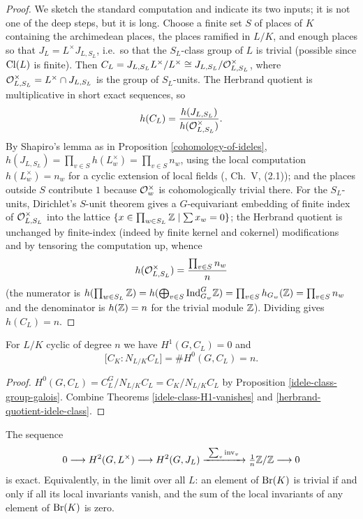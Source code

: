\begin{proof}
We sketch the standard computation and indicate its two inputs; it is not one of
the deep steps, but it is long.
Choose a finite set $S$ of places of $K$ containing the archimedean places, the
places ramified in $L/K$, and enough places so that $J_L=L^\times J_{L,S_L}$,
i.e.~so that the $S_L$-class group of $L$ is trivial (possible since ${\mathrm{Cl}}(L)$ is
finite).
Then $C_L=J_{L,S_L}L^\times/L^\times\cong J_{L,S_L}/{\mathcal {O}}_{L,S_L}^\times$, where
${\mathcal {O}}_{L,S_L}^\times=L^\times\cap J_{L,S_L}$ is the group of $S_L$-units.
The Herbrand quotient is multiplicative in short exact sequences, so
$$h(C_L)=\frac{h(J_{L,S_L})}{h({\mathcal {O}}_{L,S_L}^\times)} .$$
By Shapiro's lemma as in Proposition \ref{cohomology-of-ideles},
$h(J_{L,S_L})=\prod_{v\in S}h(L_w^\times)=\prod_{v\in S}n_w$, using the local
computation $h(L_w^\times)=n_w$ for a cyclic extension of local fields
(\cite{Neu99}, Ch.~V, (2.1)); and the places outside $S$ contribute $1$ because
${\mathcal {O}}_w^\times$ is cohomologically trivial there.
For the $S_L$-units, Dirichlet's $S$-unit theorem gives a $G$-equivariant
embedding of finite index of ${\mathcal {O}}_{L,S_L}^\times$ into the lattice
$\{x\in\prod_{w\in S_L}{\mathbb {Z}}\mid\sum x_w=0\}$; the Herbrand quotient is unchanged
by finite-index (indeed by finite kernel and cokernel) modifications and by
tensoring the computation up, whence
$$h({\mathcal {O}}_{L,S_L}^\times)=\frac{\prod_{v\in S}n_w}{n}$$
(the numerator is $h(\prod_{w\in S_L}{\mathbb {Z}})=h(\bigoplus_{v\in S}{\mathrm{Ind}}_{G_w}^G{\mathbb {Z}})
=\prod_{v\in S}h_{G_w}({\mathbb {Z}})=\prod_{v\in S}n_w$ and the denominator is
$h({\mathbb {Z}})=n$ for the trivial module ${\mathbb {Z}}$).
Dividing gives $h(C_L)=n$.
\end{proof}

\begin{cor}
\label{global-norm-index}
For $L/K$ cyclic of degree $n$ we have $H^1(G,C_L)=0$ and
$$\big[C_K:N_{L/K}C_L\big]=\#H^0(G,C_L)=n .$$
\end{cor}

\begin{proof}
$H^0(G,C_L)=C_L^G/N_{L/K}C_L=C_K/N_{L/K}C_L$ by Proposition
\ref{idele-class-group-galois}.
Combine Theorems \ref{idele-class-H1-vanishes} and
\ref{herbrand-quotient-idele-class}.
\end{proof}

\begin{thm}
\label{brauer-exact-sequence}
The sequence
$$0\longrightarrow H^2(G,L^\times)\longrightarrow H^2(G,J_L)
\xrightarrow{\ \sum_v{\mathrm{inv}}_v\ }\tfrac1n{\mathbb {Z}}/{\mathbb {Z}}\longrightarrow 0$$
is exact. Equivalently, in the limit over all $L$: an element of ${\mathrm{Br}}(K)$ is
trivial if and only if all its local invariants vanish, and the sum of the local
invariants of any element of ${\mathrm{Br}}(K)$ is zero.
\end{thm}

